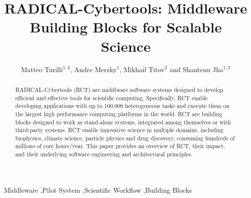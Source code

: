 \documentclass[preprint,12pt, a4paper]{elsarticle}
\begin{document}
\begin{frontmatter}

\title{RADICAL-Cybertools: Middleware Building Blocks for Scalable Science}

\author{Matteo Turilli$^{1,2}$, Andre Merzky$^1$, Mikhail Titov$^2$ and Shantenu Jha$^{1,2}$}
\address{$^1$Electrical \& Computer Engineering, Rutgers University, Piscataway, NJ 08854, USA, $^2$Brookhaven National Laboratory}

\begin{abstract}
RADICAL-Cybertools (RCT) are middlware software systems designed to develop
efficient and effective tools for scientific computing. Specifically, RCT enable
developing applications with up to 100,000 heterogeneous tasks and execute them
on the largest high performance computing platforms in the world. RCT are
building blocks designed to work as stand-alone systems, integrated among
themselves or with third-party systems. RCT enable innovative science in
multiple domains, including biophysics, climate science, particle physics and
drug discovery, consuming hundreds of millions of core hours/year. This paper
provides an overview of RCT, their impact, and their underlying software
engineering and architectural principles.
\end{abstract}

\begin{keyword}

Middleware \sep Pilot System \sep Scientific Workflow \sep Building Blocks



\end{keyword}

\end{frontmatter}


\end{document}
